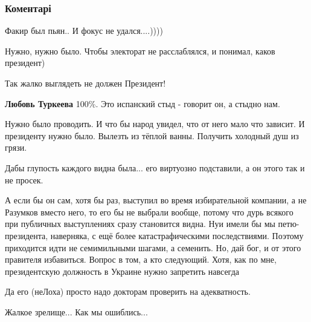  
 
 
 
 
\subsubsection{Коментарі}

\begin{itemize} %
Факир был пьян..
И фокус не удался....))))

Нужно, нужно было.
Чтобы электорат не расслаблялся, и понимал, каков президент)

Так жалко выглядеть не должен Президент!

\textbf{Любовь Туркеева} 100\%. Это испанский стыд - говорит он, а стыдно нам.

Нужно было проводить. И что бы народ увидел, что от него мало что зависит. И президенту нужно было. Вылезть из тёплой ванны. Получить холодный душ из грязи.

Дабы глупость каждого видна была... его виртуозно подставили, а он этого так и не просек.


А если бы он сам, хотя бы раз, выступил во время избирательной компании, а не
Разумков вместо него, то его бы не выбрали вообще, потому что дурь всякого при
публичных выступлениях сразу становится видна. Нуи имели бы мы петю-президента,
наверняка, с ещё более катастрафическими последствиями. Поэтому приходится идти
не семимильными шагами, а семенить. Но, дай бог, и от этого правителя
избавиться. Вопрос в том, а кто следующий. Хотя, как по мне, президентскую
должность в Украине нужно запретить навсегда

Да его (неЛоха) просто надо докторам проверить на адекватность.

Жалкое зрелище...
Как мы ошиблись...

\end{itemize} %

